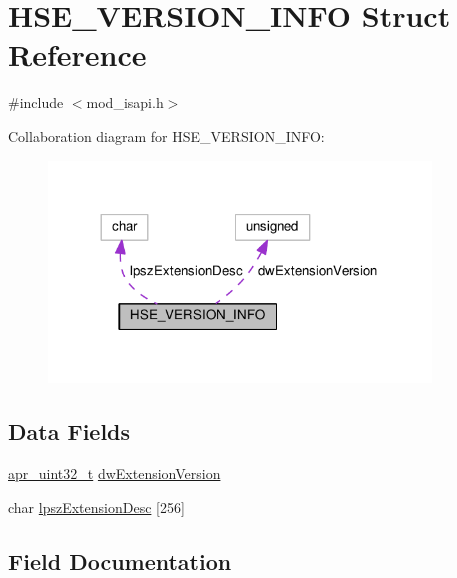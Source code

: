 \hypertarget{structHSE__VERSION__INFO}{}\section{H\+S\+E\+\_\+\+V\+E\+R\+S\+I\+O\+N\+\_\+\+I\+N\+FO Struct Reference}
\label{structHSE__VERSION__INFO}


{\ttfamily \#include $<$mod\+\_\+isapi.\+h$>$}



Collaboration diagram for H\+S\+E\+\_\+\+V\+E\+R\+S\+I\+O\+N\+\_\+\+I\+N\+FO\+:
\nopagebreak
\begin{figure}[H]
\begin{center}
\leavevmode
\includegraphics[width=288pt]{structHSE__VERSION__INFO__coll__graph}
\end{center}
\end{figure}
\subsection*{Data Fields}
\begin{DoxyCompactItemize}
\item 
\hyperlink{group__apr__platform_ga558548a135d8a816c4787250744ea147}{apr\+\_\+uint32\+\_\+t} \hyperlink{structHSE__VERSION__INFO_a766fbc302690e65e854f2f5379d3c6b1}{dw\+Extension\+Version}
\item 
char \hyperlink{structHSE__VERSION__INFO_a75caa7d1ad5473e0a33f80e96b9b62ab}{lpsz\+Extension\+Desc} \mbox{[}256\mbox{]}
\end{DoxyCompactItemize}


\subsection{Field Documentation}
